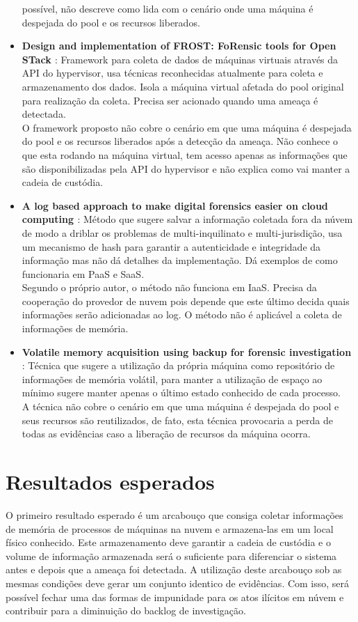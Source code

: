 \documentclass[12pt,				%
	openright,			%
	oneside,			%
	a4paper,			%
	english,			%
	brazil				%
	]{abntex2}
\begin{document}
\begin{itemize}
 possível, não descreve como lida com o cenário onde uma máquina é despejada do pool e os recursos liberados.
 \item \textbf{Design and implementation of FROST: FoRensic tools for Open STack \cite{Dykstra2013} }: Framework para coleta de dados de máquinas virtuais através da API do 
 hypervisor, usa técnicas reconhecidas atualmente para coleta e armazenamento dos dados. Isola a máquina virtual afetada do pool original para realização da coleta. Precisa 
 ser acionado quando uma ameaça é detectada.\\
 O framework proposto não cobre o cenário em que uma máquina é despejada do pool e os recursos liberados após a detecção da ameaça. Não conhece o que esta rodando na máquina 
 virtual, tem acesso apenas as informações que são disponibilizadas pela API do hypervisor e não explica como vai manter a cadeia de custódia.
 \item \textbf{A log based approach to make digital forensics easier on cloud computing \cite{Sang2013} }: Método que sugere salvar a informação coletada fora da núvem de modo a driblar
 os problemas de multi-inquilinato e multi-jurisdição, usa um mecanismo de hash para garantir a autenticidade e integridade da informação mas não dá detalhes da implementação. 
 Dá exemplos de como funcionaria em PaaS e SaaS.\\
 Segundo o próprio autor, o método não funciona em IaaS. Precisa da cooperação do provedor de nuvem pois depende que este último decida quais informações serão adicionadas ao log.
 O método não é aplicável a coleta de informações de memória.
\item \textbf{Volatile memory acquisition using backup for forensic investigation \cite{Dezfouli2012} }: Técnica que sugere a utilização da própria máquina
como repositório de informações de memória volátil, para manter a utilização de espaço ao mínimo sugere manter apenas o último estado conhecido de cada processo.\\
A técnica não cobre o cenário em que uma máquina é despejada do pool e seus recursos são reutilizados, de fato, esta técnica provocaria a perda de todas as evidências caso a 
liberação de recursos da máquina ocorra.
\end{itemize}

\chapter{Resultados esperados} \label{chap:result}
O primeiro resultado esperado é um arcabouço que consiga coletar informações de memória de processos de máquinas na nuvem e armazena-las em um local físico conhecido.
Este armazenamento deve garantir a cadeia de custódia e o volume de informação armazenada será o suficiente para diferenciar o sistema antes e depois que a ameaça foi 
detectada. A utilização deste arcabouço sob as mesmas condições deve gerar um conjunto identico de evidências. Com isso, será possível fechar uma das formas de impunidade 
para os atos ilícitos em núvem e contribuir para a diminuição do backlog de investigação.
\end{document}
